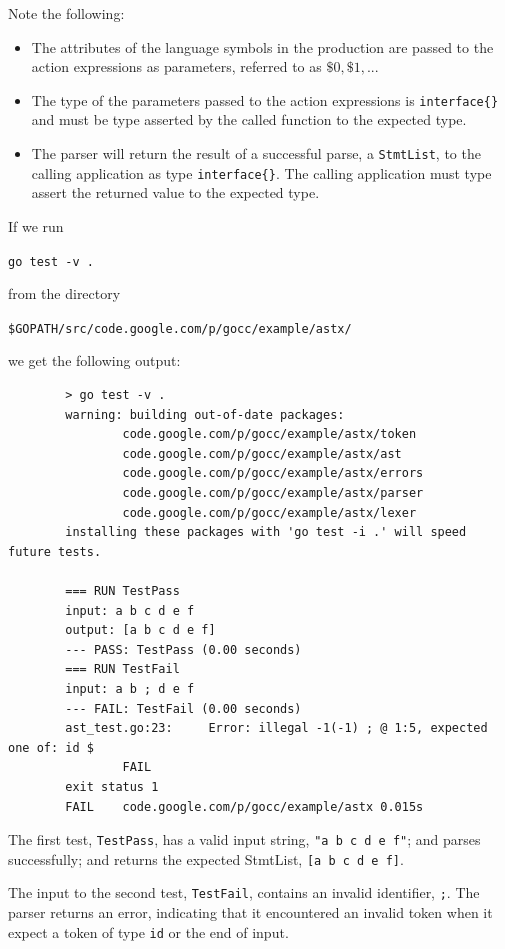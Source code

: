 \documentclass[12pt]{article}
\begin{document}
	Note the following:

	\begin{itemize}
		\item The attributes of the language symbols in the production are passed to the action expressions as parameters, referred to as $\$0, \$1, ...$

		\item The type of the parameters passed to the action expressions is \verb|interface{}| and must be type asserted by the called function to the expected type.

		\item The parser will return the result of a successful parse, a \verb"StmtList", to the calling application as type \verb"interface{}". The calling application must type assert the returned value to the expected type.
	\end{itemize}

	If we run 

	\verb"go test -v ." 

	from the directory 

	\verb|$GOPATH/src/code.google.com/p/gocc/example/astx/| 

	we get the following output:

	\begin{verbatim}
		> go test -v .
		warning: building out-of-date packages:
		        code.google.com/p/gocc/example/astx/token
		        code.google.com/p/gocc/example/astx/ast
		        code.google.com/p/gocc/example/astx/errors
		        code.google.com/p/gocc/example/astx/parser
		        code.google.com/p/gocc/example/astx/lexer
		installing these packages with 'go test -i .' will speed future tests.

		=== RUN TestPass
		input: a b c d e f
		output: [a b c d e f]
		--- PASS: TestPass (0.00 seconds)
		=== RUN TestFail
		input: a b ; d e f
		--- FAIL: TestFail (0.00 seconds)
		ast_test.go:23: 	Error: illegal -1(-1) ; @ 1:5, expected one of: id $
		        FAIL
		exit status 1
		FAIL	code.google.com/p/gocc/example/astx	0.015s	\end{verbatim}

	The first test, \verb"TestPass", has a valid input string, \verb|"a b c d e f"|; and parses successfully; and returns the expected StmtList, \verb|[a b c d e f]|.

	The input to the second test, \verb|TestFail|, contains an invalid identifier, \verb|;|. The parser returns an error, indicating that it encountered an invalid token when it expect a token of type \verb|id| or the end of input.
\end{document}
